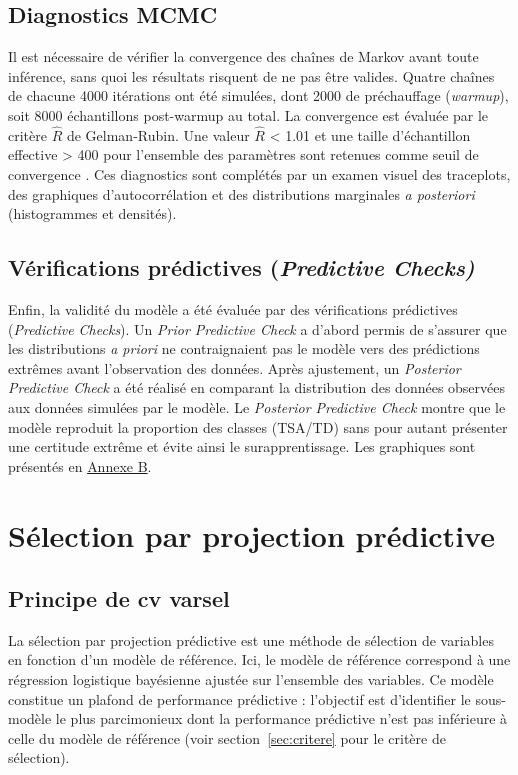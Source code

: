 \subsection{Diagnostics MCMC}
Il est nécessaire de vérifier la convergence des chaînes de Markov avant toute inférence, sans quoi les résultats risquent de ne pas être valides. Quatre chaînes de chacune 4000 itérations ont été simulées, dont 2000 de préchauffage (\textit{warmup}), soit 8000 échantillons post-warmup au total. %
La convergence est évaluée par le critère $\hat{R}$ de Gelman-Rubin. Une valeur $\hat{R}$ < 1.01 et une taille d'échantillon effective > 400 pour l'ensemble des paramètres sont retenues comme seuil de convergence \parencite{Vehtari2019Mar}. Ces diagnostics sont complétés par un examen visuel des traceplots, des graphiques d'autocorrélation et des distributions marginales \textit{a posteriori} (histogrammes et densités). %
 
\subsection{Vérifications prédictives (\textit{Predictive Checks)}}

Enfin, la validité du modèle a été évaluée par des vérifications prédictives (\textit{Predictive Checks}). Un \textit{Prior Predictive Check} a d'abord permis de s'assurer que les distributions \textit{a priori} ne contraignaient pas le modèle vers des prédictions extrêmes avant l'observation des données. Après ajustement, un \textit{Posterior Predictive Check} a été réalisé en comparant la distribution des données observées aux données simulées par le modèle. Le \textit{Posterior Predictive Check} montre que le modèle reproduit la proportion des classes (TSA/TD) sans pour autant présenter une certitude extrême et évite ainsi le surapprentissage. Les graphiques sont présentés en \hyperref[fig:ppc]{Annexe B}.


\section{Sélection par projection prédictive}
\subsection{Principe de cv varsel}
La sélection par projection prédictive \parencite{Piironen2018Oct} est une méthode de sélection de variables en fonction d'un modèle de référence. Ici, le modèle de référence correspond à une régression logistique bayésienne ajustée sur l'ensemble des variables. Ce modèle constitue un plafond de performance prédictive : l'objectif est d'identifier le sous-modèle le plus parcimonieux dont la performance prédictive n'est pas inférieure à celle du modèle de référence (voir section~\ref{sec:critere} pour le critère de sélection).

